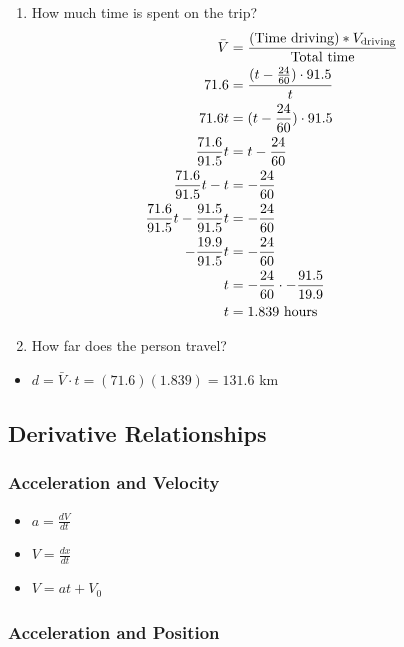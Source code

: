 \documentclass[
  letterpaper,
  DIV=11,
  numbers=noendperiod]{scrartcl}
\providecommand{\tightlist}{%
  \setlength{\itemsep}{0pt}\setlength{\parskip}{0pt}}\usepackage{longtable,booktabs,array}
\begin{document}
\begin{enumerate}
\def\labelenumi{(\alph{enumi})}
\tightlist
\item
  How much time is spent on the trip? \begin{align*}
  \bar{V} &= \frac{(\text{Time driving})*V_\text{driving}}{\text{Total time}} \\
  71.6 &= \cfrac{(t-\frac{24}{60})\cdot 91.5}{t} \\
  71.6t &= (t-\frac{24}{60})\cdot 91.5 \\
  \frac{71.6}{91.5}t &= t-\frac{24}{60} \\
  \frac{71.6}{91.5}t - t &= -\frac{24}{60} \\
  \frac{71.6}{91.5}t - \frac{91.5}{91.5}t &= -\frac{24}{60} \\
  -\frac{19.9}{91.5}t &= -\frac{24}{60} \\
  t &= -\frac{24}{60}\cdot -\frac{91.5}{19.9} \\
  t &= 1.839 \text{ hours}
  \end{align*}
\item
  How far does the person travel?
\end{enumerate}

\begin{itemize}
\tightlist
\item
  \(d = \bar{V}\cdot t = (71.6)(1.839) = 131.6\) km
\end{itemize}

\newpage{}

\hypertarget{derivative-relationships}{%
\subsection{Derivative Relationships}\label{derivative-relationships}}

\hypertarget{acceleration-and-velocity}{%
\subsubsection{Acceleration and
Velocity}\label{acceleration-and-velocity}}

\begin{itemize}
\tightlist
\item
  \(a = \frac{dV}{dt}\)
\item
  \(V = \frac{dx}{dt}\)
\item
  \(V = at + V_0\)
\end{itemize}

\hypertarget{acceleration-and-position}{%
\subsubsection{Acceleration and
Position}\label{acceleration-and-position}}
\end{document}
